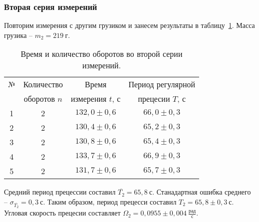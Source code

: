 \documentclass[a4paper,11pt]{article}
\begin{document}
\subsubsection{Вторая серия измерений} %
Повторим измерения с другим грузиком и занесем результаты в таблицу~\ref{table:tab2}.\newline
Масса грузика -- $m_{2} = 219\ г$.
\begin{table}[h!]
\centering
\begin{tabular}{ ||c|c|c|c|| }
  \hline
  № & Количество & Время & Период регулярной \\
   & оборотов $n$ & измерения $t$, $с$ & прецесии $T$, $с$ \\
  \hline
  1 & 2 & $132,0 \pm 0,6$ & $66,0 \pm 0,3$ \\
  2 & 2 & $130,4 \pm 0,6$ & $65,2 \pm 0,3$ \\
  3 & 2 & $130,8 \pm 0,6$ & $65,4 \pm 0,3$ \\
  4 & 2 & $133,7 \pm 0,6$ & $66,9 \pm 0,3$ \\
  5 & 2 & $131,7 \pm 0,6$ & $65,7 \pm 0,3$ \\
  \hline
\end{tabular}
\caption{Время и количество оборотов во второй серии измерений.}
\label{table:tab2}
\end{table}\newline
Средний период прецессии составил $\overline{T_{2}} = 65,8\ с$.\newline
Станадартная ошибка среднего -- $\sigma_{\overline{T_{2}}}= 0,3\ с$.\newline
Таким образом, период прецесси составил $T_{2} = 65,8 \pm 0,3\ с$.\newline
Угловая скорость прецесии составляет $\Omega_{2} = 0,0955 \pm 0,004\ \frac{рад}{с}$.
\end{document}
